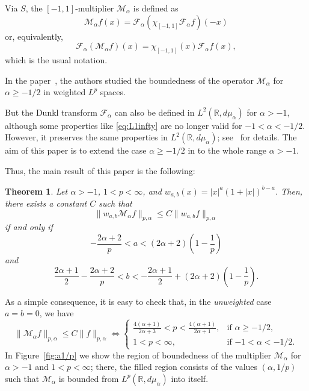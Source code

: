 \documentclass[a4paper]{amsart}
\numberwithin{equation}{section}
\theoremstyle{plain}
\newtheorem*{theorem}{Theorem}
\theoremstyle{remark}
\newcommand{\R}{\mathbb{R}}
\newcommand{\Fa}{\mathcal{F}_\alpha} %
\newcommand{\Ma}{\mathcal{M}_\alpha} %
\newcommand{\mua}{\mu_\alpha}
\newcommand{\pa}{{p,\alpha}}
\begin{document}
Via $S$, the $[-1,1]$-multiplier $\Ma$ is defined as
\begin{equation}
\label{eq:Ma}
  \Ma f(x) = \Fa(\chi_{[-1,1]} \Fa f)(-x)
\end{equation}
or, equivalently,
$$
  \Fa(\Ma f)(x) = \chi_{[-1,1]}(x)\Fa f(x),
$$
which is the usual notation.

In the paper~\cite{BCV}, the authors studied the boundedness of the operator $\Ma$ for $\alpha\ge-1/2$ in weighted $L^p$ spaces. 

But the Dunkl transform $\Fa$ can also be defined in $L^2(\R,d\mu_{\alpha})$ 
for $\alpha > -1$, although some properties
like \eqref{eq:L1infty} are no longer valid for $-1 < \alpha < -1/2$.
However, it preserves the same properties in $L^2(\R,d\mu_{\alpha})$; 
see~\cite{Ros} for details. 
The aim of this paper is to extend the case $\alpha \ge -1/2$ in \cite{BCV}
to the whole range $\alpha > -1$.

Thus, the main result of this paper is the following:

\begin{theorem}
\label{th:acotMab-1}
Let $\alpha > -1$, $1<p<\infty$, and
$w_{a,b}(x) = |x|^a (1+|x|)^{b-a}$.
Then, there exists a constant $C$ such that
\begin{equation}
\label{eq:acotMa-1}
   \|w_{a,b} \Ma f \|_\pa \le C \|w_{a,b} f\|_\pa
\end{equation} 
if and only if 
\begin{equation}
\label{eq:nec1}
  -\frac{2\alpha+2}{p} < a < (2\alpha+2)\left(1-\frac1p\right)
\end{equation}
and 
\begin{equation}
\label{eq:nec2}
  \frac{2\alpha+1}{2} - \frac{2\alpha+2}{p}
    < b < -\frac{2\alpha+1}{2} + (2\alpha+2)\left(1-\frac1p\right).
\end{equation}
\end{theorem}

As a simple consequence, it is easy to check that, in the \textit{unweighted} case $a=b=0$, we have
\begin{equation*}
  \|\Ma f\|_\pa \le C \|f\|_\pa
  \iff
  \begin{cases}
  \displaystyle
  \frac{4(\alpha+1)}{2\alpha+3} < p < \frac{4(\alpha+1)}{2\alpha+1}, & \text{if $\alpha\ge-1/2$}, \\[1ex]
  1 < p < \infty, & \text{if $-1 < \alpha < -1/2$}.
  \end{cases}
\end{equation*}
In Figure~\ref{fig:a1/p} we show the region of boundedness of the multiplier $\Ma$ for $\alpha>-1$ and $1<p<\infty$; 
there, the filled region consists of the values $(\alpha,1/p)$ such that $\Ma$ is bounded from $L^p(\R,d\mua)$
into itself.
\end{document}
